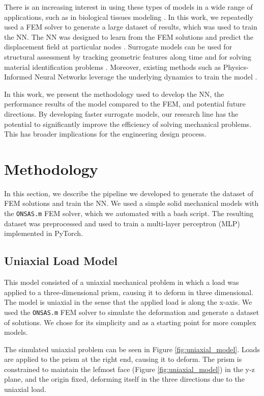 \documentclass[oneside,a4paper,english,links]{amca}
\begin{document}
There is an increasing interest in using these types of models in a wide range of applications, such as in biological tissues modeling \citep{pellicer2020real}. In this work, we repeatedly used a FEM solver to generate a large dataset of results, which was used to train the NN. The NN was designed to learn from the FEM solutions and predict the displacement field at particular nodes \citep{yang2022tracker}. Surrogate models can be used for structural assessment by tracking geometric features along time \citep{zhu2023visual} and for solving material identification problems \citep{steuben2015inverse}. Moreover, existing methods such as Physics-Informed Neural Networks leverage the underlying dynamics to train the model \citep{raissi2017physics}.

In this work, we present the methodology used to develop the NN, the performance results of the model compared to the FEM, and potential future directions. By developing faster surrogate models, our research line has the potential to significantly improve the efficiency of solving mechanical problems. This has broader implications for the engineering design process.

\section{Methodology}
In this section, we describe the pipeline we developed to generate the dataset of FEM solutions and train the NN. We used a simple solid mechanical models with the \texttt{ONSAS.m} FEM solver, which we automated with a bash script. The resulting dataset was preprocessed and used to train a multi-layer perceptron (MLP) implemented in PyTorch.

\subsection{Uniaxial Load Model}
This model consisted of a uniaxial mechanical problem in which a load was applied to a three-dimensional prism, causing it to deform in three dimensional. The model is uniaxial in the sense that the applied load is along the x-axis. We used the \texttt{ONSAS.m} FEM solver to simulate the deformation and generate a dataset of solutions. We chose for its simplicity and as a starting point for more complex models.

The simulated uniaxial problem can be seen in Figure \ref{fig:uniaxial_model}. Loads are applied to the prism at the right end, causing it to deform. The prism is constrained to maintain the lefmost face (Figure \ref{fig:uniaxial_model}) in the y-z plane, and the origin fixed, deforming itself in the three directions due to the uniaxial load.
\end{document}
